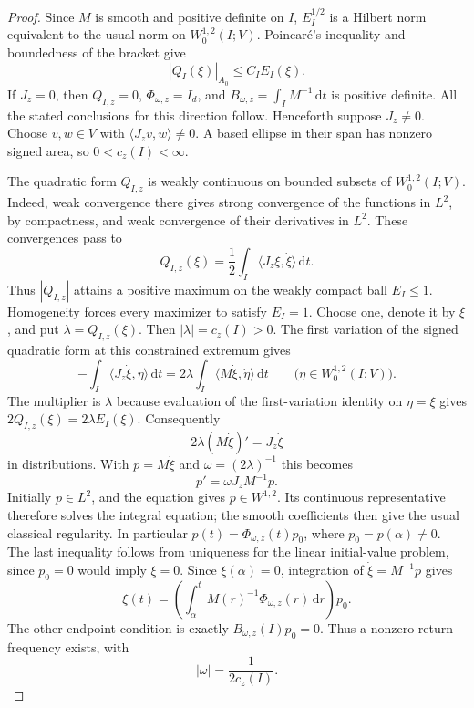 \documentclass[10pt,a4paper]{article}
\numberwithin{equation}{section}
\theoremstyle{definition}
\theoremstyle{remark}
\newcommand{\dd}{\mathrm d}
\begin{document}
\begin{proof}
Since $M$ is smooth and positive definite on $I$, $E_I^{1/2}$ is a Hilbert
norm equivalent to the usual norm on $W^{1,2}_0(I;V)$.  Poincar\'e's
inequality and boundedness of the bracket give
\begin{equation}
 |Q_I(\xi)|_{A_0}\le C_I E_I(\xi).
 \label{eq:general-area-bound}
\end{equation}
If $J_z=0$, then $Q_{I,z}=0$, $\Phi_{\omega,z}=I_d$, and
$B_{\omega,z}=\int_I M^{-1}\,\dd t$ is positive definite.  All the stated
conclusions for this direction follow.  Henceforth suppose $J_z\ne0$.
Choose $v,w\in V$ with $\langle J_zv,w\rangle\ne0$.  A based ellipse in
their span has nonzero signed area, so $0<c_z(I)<\infty$.

The quadratic form $Q_{I,z}$ is weakly continuous on bounded subsets of
$W^{1,2}_0(I;V)$.  Indeed, weak convergence there gives strong convergence
of the functions in $L^2$, by compactness, and weak convergence of their
derivatives in $L^2$.  These convergences pass to
\[
 Q_{I,z}(\xi)
   =\frac12\int_I\langle J_z\xi,\dot\xi\rangle\,\dd t.
\]
Thus $|Q_{I,z}|$ attains a positive maximum on the weakly compact ball
$E_I\le1$.  Homogeneity forces every maximizer to satisfy $E_I=1$.
Choose one, denote it by $\xi$, and put
$\lambda=Q_{I,z}(\xi)$.  Then $|\lambda|=c_z(I)>0$.  The first
variation of the signed quadratic form at this constrained extremum gives
\[
 -\int_I\langle J_z\dot\xi,\eta\rangle\,\dd t
   =2\lambda\int_I\langle M\dot\xi,\dot\eta\rangle\,\dd t
 \qquad\bigl(\eta\in W^{1,2}_0(I;V)\bigr).
\]
The multiplier is $\lambda$ because evaluation of the first-variation
identity on $\eta=\xi$ gives $2Q_{I,z}(\xi)=2\lambda E_I(\xi)$.
Consequently
\begin{equation}
 2\lambda(M\dot\xi)'=J_z\dot\xi
 \label{eq:general-area-euler-lagrange}
\end{equation}
in distributions.  With $p=M\dot\xi$ and
$\omega=(2\lambda)^{-1}$ this becomes
\[
 p'=\omega J_zM^{-1}p.
\]
Initially $p\in L^2$, and the equation gives $p\in W^{1,2}$.  Its
continuous representative therefore solves the integral equation; the
smooth coefficients then give the usual classical regularity.  In
particular $p(t)=\Phi_{\omega,z}(t)p_0$, where $p_0=p(\alpha)\ne0$.
The last inequality follows from uniqueness for the linear initial-value
problem, since $p_0=0$ would imply $\xi=0$.
Since $\xi(\alpha)=0$, integration of $\dot\xi=M^{-1}p$ gives
\begin{equation}
 \xi(t)=\left(\int_\alpha^t
           M(r)^{-1}\Phi_{\omega,z}(r)\,\dd r\right)p_0.
 \label{eq:general-area-loop-reconstruction}
\end{equation}
The other endpoint condition is exactly
$B_{\omega,z}(I)p_0=0$.  Thus a nonzero return frequency exists, with
\begin{equation}
 |\omega|=\frac1{2c_z(I)}.
 \label{eq:general-area-extremal-frequency}
\end{equation}


\end{proof}
\end{document}
